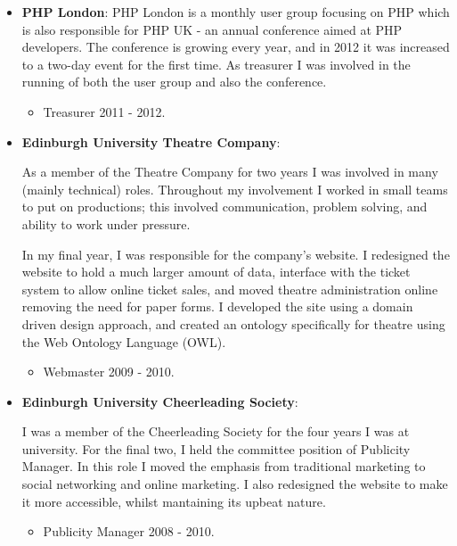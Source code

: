 \documentclass[a4paper]{article}
\begin{document}
\begin{itemize}
\item {\bf PHP London}: 
PHP London is a monthly user group focusing on PHP which is also responsible for PHP UK - an annual conference aimed at PHP developers.  The conference is growing every year, and in 2012 it was increased to a two-day event for the first time.  As treasurer I was involved in the running of both the user group and also the conference.

\begin{itemize}
\item Treasurer 2011 - 2012.
\end{itemize}

\item {\bf Edinburgh University Theatre Company}: 

As a member of the Theatre Company for two years I was involved in many (mainly technical) roles.  Throughout my involvement I worked in small teams to put on productions; this involved communication, problem solving, and ability to work under pressure.

In my final year, I was responsible for the company's website.  I redesigned the website to hold a much larger amount of data, interface with the ticket system to allow online ticket sales, and moved theatre administration online removing the need for paper forms.   I developed the site using a domain driven design approach, and created an ontology specifically for theatre using the Web Ontology Language (OWL).

\begin{itemize}

\item Webmaster 2009 - 2010.

\end{itemize}

\item {\bf Edinburgh University Cheerleading Society}: 

I was a member of the Cheerleading Society for the four years I was at university.  For the final two, I held the committee position of Publicity Manager.  In this role I moved the emphasis from traditional marketing to social networking and online marketing. I also redesigned the website to make it more accessible, whilst mantaining its upbeat nature.
\begin{itemize}
\item Publicity Manager 2008 - 2010.
\end{itemize}


\end{itemize}
\end{document}

